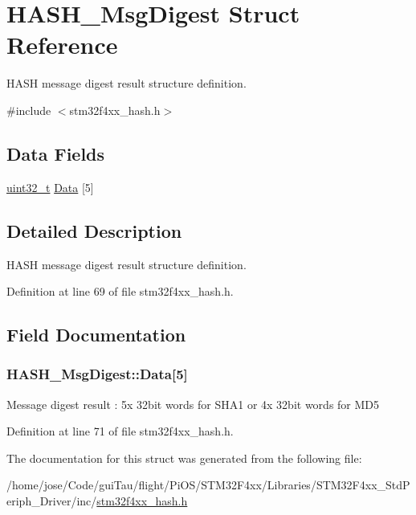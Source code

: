 \hypertarget{struct_h_a_s_h___msg_digest}{\section{H\-A\-S\-H\-\_\-\-Msg\-Digest Struct Reference}
\label{struct_h_a_s_h___msg_digest}
}


H\-A\-S\-H message digest result structure definition.  




{\ttfamily \#include $<$stm32f4xx\-\_\-hash.\-h$>$}

\subsection*{Data Fields}
\begin{DoxyCompactItemize}
\item 
\hyperlink{stdint_8h_a435d1572bf3f880d55459d9805097f62}{uint32\-\_\-t} \hyperlink{struct_h_a_s_h___msg_digest_ada351faa0dac9c6d0e502daebee8d6c3}{Data} \mbox{[}5\mbox{]}
\end{DoxyCompactItemize}


\subsection{Detailed Description}
H\-A\-S\-H message digest result structure definition. 

Definition at line 69 of file stm32f4xx\-\_\-hash.\-h.



\subsection{Field Documentation}
\hypertarget{struct_h_a_s_h___msg_digest_ada351faa0dac9c6d0e502daebee8d6c3}{
\subsubsection[{Data}]{ H\-A\-S\-H\-\_\-\-Msg\-Digest\-::\-Data\mbox{[}5\mbox{]}}}\label{struct_h_a_s_h___msg_digest_ada351faa0dac9c6d0e502daebee8d6c3}
Message digest result \-: 5x 32bit words for S\-H\-A1 or 4x 32bit words for M\-D5 

Definition at line 71 of file stm32f4xx\-\_\-hash.\-h.



The documentation for this struct was generated from the following file\-:\begin{DoxyCompactItemize}
\item 
/home/jose/\-Code/gui\-Tau/flight/\-Pi\-O\-S/\-S\-T\-M32\-F4xx/\-Libraries/\-S\-T\-M32\-F4xx\-\_\-\-Std\-Periph\-\_\-\-Driver/inc/\hyperlink{stm32f4xx__hash_8h}{stm32f4xx\-\_\-hash.\-h}\end{DoxyCompactItemize}
